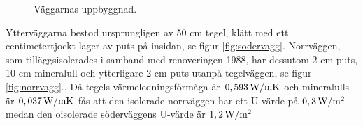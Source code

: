 \begin{figure}[hpbt]
\centering
{}%

\caption{\label{fig:thewalls} Väggarnas uppbyggnad.}
\end{figure}

Ytterväggarna bestod ursprungligen av 50 cm tegel, klätt med ett centimetertjockt lager av puts på insidan, se figur \ref{fig:sodervagg}. Norrväggen, som tilläggsisolerades i samband med renoveringen 1988, har dessutom 2 cm puts, 10 cm mineralull och ytterligare 2 cm puts utanpå tegelväggen, se figur \ref{fig:norrvagg}.\cite{kandidatarbete2010}\cite{petersarneo}. Då tegels värmeledningsförmåga är $\unit[0,593]{W/mK}$ och mineralulls är $\unit[0,037]{W/mK}$ fås att den isolerade norrväggen har ett U-värde på $\unit[0,3]{W/m^2}$ medan den oisolerade söderväggens U-värde är $\unit[1,2]{W/m^2}$

